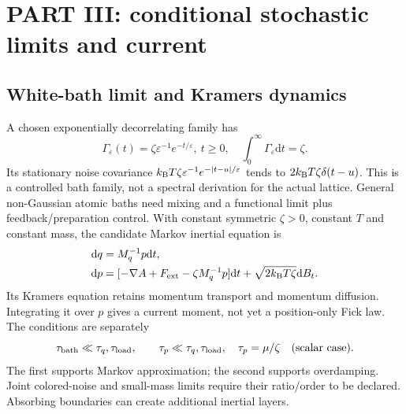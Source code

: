 \documentclass[11pt]{article}
\newcommand{\kb}{k_{\rm B}}
\newcommand{\dd}{\mathrm d}
\begin{document}
\section{PART III: conditional stochastic limits and current}
\subsection{White-bath limit and Kramers dynamics}
A chosen exponentially decorrelating family has
\begin{equation}
\Gamma_\varepsilon(t)=\zeta\varepsilon^{-1}e^{-t/\varepsilon},\ t\geq0,
\quad\int_0^\infty\Gamma_\varepsilon\dd t=\zeta.
\end{equation}
Its stationary noise covariance
$\kb T\zeta\varepsilon^{-1}e^{-|t-u|/\varepsilon}$ tends to
$2\kb T\zeta\delta(t-u)$. This is a controlled bath family, not a spectral
derivation for the actual lattice. General non-Gaussian atomic baths need
mixing and a functional limit plus feedback/preparation control.
With constant symmetric $\zeta>0$, constant $T$ and constant mass, the
candidate Markov inertial equation is
\begin{align}
\dd q&=M_q^{-1}p\dd t,\\
\dd p&=[-\nabla A+F_{\rm ext}-\zeta M_q^{-1}p]\dd t
                         +\sqrt{2\kb T\zeta}\dd B_t.
\end{align}
Its Kramers equation retains momentum transport and momentum diffusion.
Integrating it over $p$ gives a current moment, not yet a position-only
Fick law. The conditions are separately
\begin{equation}
\tau_{\rm bath}\ll\tau_q,\tau_{\rm load},\qquad
\tau_p\ll\tau_q,\tau_{\rm load},\quad\tau_p=\mu/\zeta
\quad\hbox{(scalar case)}.
\end{equation}
The first supports Markov approximation; the second supports overdamping.
Joint colored-noise and small-mass limits require their ratio/order to be
declared. Absorbing boundaries can create additional inertial layers.
\end{document}
